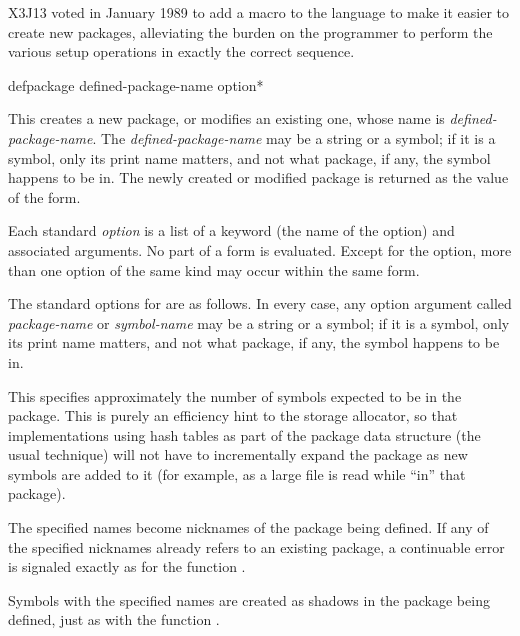 \begin{new}
X3J13 voted in January 1989
to add a macro  to the
language to make it easier to create new packages, alleviating the burden
on the programmer to perform the various setup operations in exactly the
correct sequence.

\begin{defmac}
defpackage defined-package-name {option}*

This creates a new package, or modifies an existing one, whose name
is {\it defined-package-name}.  The {\it defined-package-name}
may be a string or a symbol;
if it is a symbol, only its print name matters, and not what package, if any,
the symbol happens to be in.
The newly created or modified package is returned as the value of
the  form.

Each standard {\it option} is a list of a keyword (the name of the option)
and associated arguments.  No part of a  form is evaluated.
Except for the  option, more than one option of the same
kind may occur within the same  form.

The standard options for  are as follows.
In every case, any option argument called {\it package-name}
or {\it symbol-name}
may be a string or a symbol;
if it is a symbol, only its print name matters, and not what package, if any,
the symbol happens to be in.

\begin{flushdesc}
\item[\cd{(:size {\it integer})}]
This specifies approximately the number of symbols expected to be in the
package.  This is purely an efficiency hint to the storage allocator,
so that implementations using hash tables as part
of the package data structure (the usual technique) will not
have to incrementally expand the package as new symbols are added to it
(for example, as a large file is read while ``in'' that package).

\item[\cd{(:nicknames \Mstar{\it package-name})}]
The specified names become nicknames of the package being defined.
If any of the specified nicknames already refers to an existing
package, a continuable error is signaled exactly as for the
function .

\item[\cd{(:shadow \Mstar{\it symbol-name})}]
Symbols with the specified names are created as shadows
in the package being defined, just as with the function .


\end{flushdesc}
\end{defmac}
\end{new}
